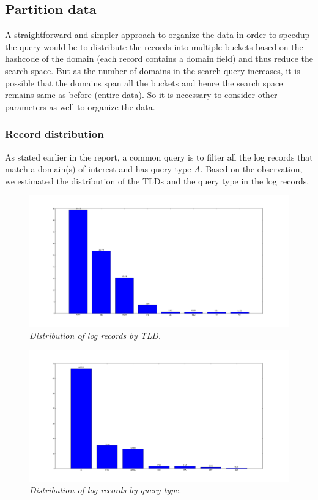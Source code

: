 \documentclass[11pt,a4paper]{article}
\begin{document}
\subsection{Partition data}
A straightforward and simpler approach to organize the data in order to speedup the query would be to distribute the records into multiple buckets based on the hashcode of the domain (each record contains a domain field) and thus reduce the search space. But as the number of domains in the search query increases, it is possible that the domains span all the buckets and hence the search space remains same as before (entire data). So it is necessary to consider other parameters as well to organize the data.

\subsubsection{Record distribution}
As stated earlier in the report, a common query is to filter all the log records that match a domain(s) of interest and has query type $A$. Based on the observation, we estimated the distribution of the TLDs and the query type in the log records.

\begin{figure}[h] 
\includegraphics[width=1\linewidth]{./data/RESULTS/graphs/tld_distribution.png}
\caption {\textit{Distribution of log records by TLD.}}
\end{figure}

\begin{figure}[H] 
\centering
\includegraphics[width=1\textwidth]{./data/RESULTS/graphs/qtype_distribution.png}
\caption {\textit{Distribution of log records by query type.}}
\end{figure}
\end{document}

